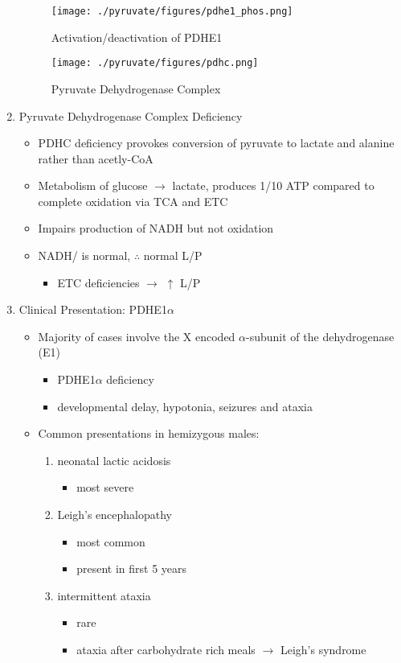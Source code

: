 \documentclass{scrartcl}
\begin{document}
\begin{enumerate}
\begin{figure}[htbp]
\centering
\texttt{[image: ./pyruvate/figures/pdhe1\_phos.png]}
\caption[pdhe1]{\label{fig:org2513960}
Activation/deactivation of PDHE1}
\end{figure}


\begin{figure}[htbp]
\centering
\texttt{[image: ./pyruvate/figures/pdhc.png]}
\caption[pdhc]{\label{fig:orgb7fda6d}
Pyruvate Dehydrogenase Complex}
\end{figure}

\item Pyruvate Dehydrogenase Complex Deficiency
\label{sec:org72bc8ab}
\begin{itemize}
\item PDHC deficiency provokes conversion of pyruvate to lactate and alanine rather than acetly-CoA
\item Metabolism of glucose \(\to\) lactate, produces 1/10 ATP compared to
complete oxidation via TCA and ETC
\item Impairs production of NADH but not oxidation
\item NADH/ is normal, \(\therefore\) normal L/P
\begin{itemize}
\item ETC deficiencies \(\to\) \(\uparrow\) L/P
\end{itemize}
\end{itemize}

\item Clinical Presentation: PDHE1\(\alpha\)
\label{sec:org0042e34}
\begin{itemize}
\item Majority of cases involve the X encoded \(\alpha\)-subunit of the dehydrogenase (E1)
\begin{itemize}
\item PDHE1\(\alpha\) deficiency
\item developmental delay, hypotonia, seizures and ataxia
\end{itemize}

\item Common presentations in hemizygous males:
\begin{enumerate}
\item neonatal lactic acidosis
\begin{itemize}
\item most severe
\end{itemize}
\item Leigh's encephalopathy
\begin{itemize}
\item most common
\item present in first 5 years
\end{itemize}
\item intermittent ataxia
\begin{itemize}
\item rare
\item ataxia after carbohydrate rich meals \(\to\) Leigh's syndrome
\end{itemize}
\end{enumerate}


\end{itemize}
\end{enumerate}
\end{document}
